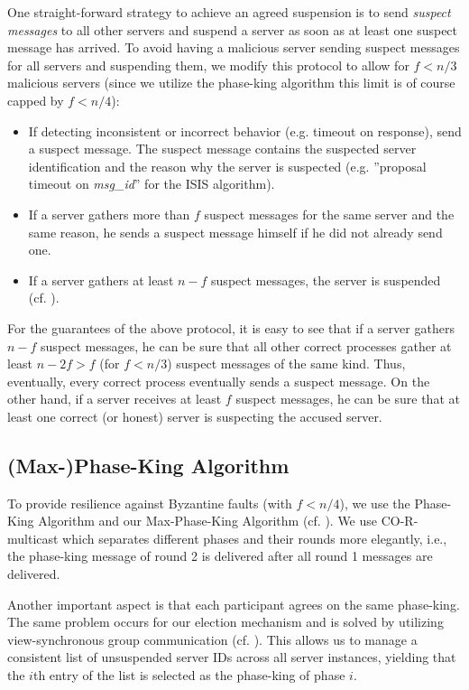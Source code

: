 \documentclass[runningheads]{llncs}
\begin{document}
One straight-forward strategy to achieve an agreed suspension is to send \textit{suspect messages} to all other servers and suspend a server as soon as at least one suspect message has arrived. To avoid having a malicious server sending suspect messages for all servers and suspending them, we modify this protocol to allow for $f < n/3$ malicious servers (since we utilize the phase-king algorithm this limit is of course capped by $f < n/4$):
\begin{itemize}
    \item If detecting inconsistent or incorrect behavior (e.g. timeout on response), send a suspect message. The suspect message contains the suspected server identification and the reason why the server is suspected (e.g. ''proposal timeout on \textit{msg\_id}'' for the ISIS algorithm).
    \item If a server gathers more than $f$ suspect messages for the same server and the same reason, he sends a suspect message himself if he did not already send one.
    \item If a server gathers at least $n-f$ suspect messages, the server is suspended (cf. ).
\end{itemize}
For the guarantees of the above protocol, it is easy to see that if a server gathers $n-f$ suspect messages, he can be sure that all other correct processes gather at least $n-2f > f$ (for $f < n/3$) suspect messages of the same kind. Thus, eventually, every correct process eventually sends a suspect message. On the other hand, if a server receives at least $f$ suspect messages, he can be sure that at least one correct (or honest) server is suspecting the accused server.

\subsection{(Max-)Phase-King Algorithm}\label{sec:consensus}
To provide resilience against Byzantine faults (with $f < n/4$), we use the Phase-King Algorithm \cite{phaseking} and our Max-Phase-King Algorithm (cf. ). We use CO-R-multicast which separates different phases and their rounds more elegantly, i.e., the phase-king message of round 2 is delivered after all round 1 messages are delivered. 

Another important aspect is that each participant agrees on the same phase-king. The same problem occurs for our election mechanism and is solved by utilizing view-synchronous group communication (cf. ). This allows us to manage a consistent list of unsuspended server IDs across all server instances, yielding that the $i$th entry of the list is selected as the phase-king of phase $i$. 
\end{document}
